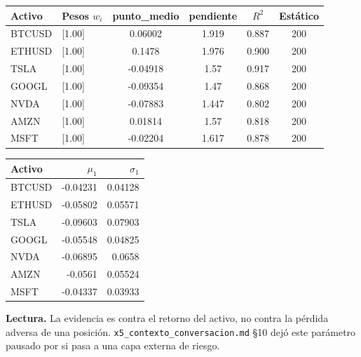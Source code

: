 \documentclass[11pt,a4paper]{article}
\newcommand{\code}[1]{\texttt{\small #1}}
\begin{document}
\begin{center}\end{center}
\begin{center}\small\setlength{\tabcolsep}{5pt}
\begin{tabular}{llcccc}\toprule
Activo & Pesos $w_i$ & punto\_medio & pendiente & $R^2$ & Estático \\\midrule
BTCUSD & [1.00] & 0.06002 & 1.919 & 0.887 & 200 \\
ETHUSD & [1.00] & 0.1478 & 1.976 & 0.900 & 200 \\
TSLA & [1.00] & -0.04918 & 1.57 & 0.917 & 200 \\
GOOGL & [1.00] & -0.09354 & 1.47 & 0.868 & 200 \\
NVDA & [1.00] & -0.07883 & 1.447 & 0.802 & 200 \\
AMZN & [1.00] & 0.01814 & 1.57 & 0.818 & 200 \\
MSFT & [1.00] & -0.02204 & 1.617 & 0.878 & 200 \\
\bottomrule\end{tabular}

\medskip
\begin{tabular}{lrr}\toprule
Activo & $\mu_1$ & $\sigma_1$ \\\midrule
BTCUSD & -0.04231 & 0.04128 \\
ETHUSD & -0.05802 & 0.05571 \\
TSLA & -0.09603 & 0.07903 \\
GOOGL & -0.05548 & 0.04825 \\
NVDA & -0.06895 & 0.0658 \\
AMZN & -0.0561 & 0.05524 \\
MSFT & -0.04337 & 0.03933 \\
\bottomrule\end{tabular}\end{center}
\textbf{Lectura.} La evidencia es contra el retorno del activo, no contra la pérdida adversa de una posición. \code{x5\_contexto\_conversacion.md} §10 dejó este parámetro pausado por si pasa a una capa externa de riesgo.
\end{document}
